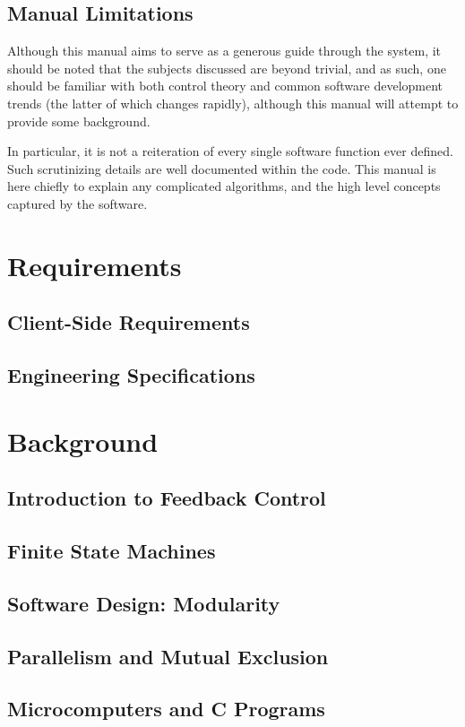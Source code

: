 \documentclass[letterpaper]{article}
\begin{document}
\subsection{Manual Limitations}
Although this manual aims to serve as a generous guide through the system, it should be noted that the subjects discussed are beyond trivial, and as such, one should be familiar with both control theory and common software development trends (the latter of which changes rapidly), although this manual will attempt to provide some background.

In particular, it is not a reiteration of every single software function ever defined. Such scrutinizing details are well documented within the code. This manual is here chiefly to explain any complicated algorithms, and the high level concepts captured by the software.

\newpage

\section{Requirements}
\subsection{Client-Side Requirements}
\subsection{Engineering Specifications}

\newpage

\section{Background}
\subsection{Introduction to Feedback Control}
\subsection{Finite State Machines}
\subsection{Software Design: Modularity}
\subsection{Parallelism and Mutual Exclusion}
\subsection{Microcomputers and C Programs}
\end{document}
